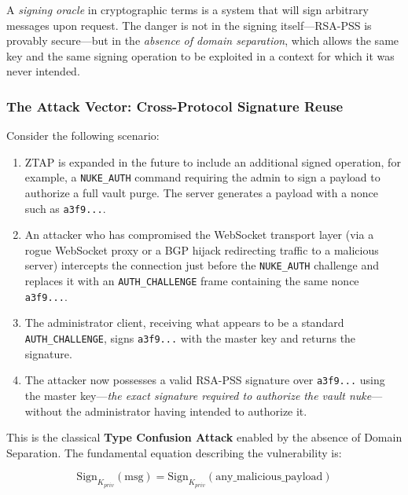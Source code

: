 \documentclass[12pt,a4paper]{article}
\begin{document}
A \textit{signing oracle} in cryptographic terms is a system that will sign arbitrary messages upon request. The danger is not in the signing itself---RSA-PSS is provably secure---but in the \textit{absence of domain separation}, which allows the same key and the same signing operation to be exploited in a context for which it was never intended.

\subsubsection{The Attack Vector: Cross-Protocol Signature Reuse}

Consider the following scenario:

\begin{enumerate}
    \item ZTAP is expanded in the future to include an additional signed operation, for example, a \texttt{NUKE\_AUTH} command requiring the admin to sign a payload to authorize a full vault purge. The server generates a payload with a nonce such as \texttt{a3f9...}. 
    
    \item An attacker who has compromised the WebSocket transport layer (via a rogue WebSocket proxy or a BGP hijack redirecting traffic to a malicious server) intercepts the connection just before the \texttt{NUKE\_AUTH} challenge and replaces it with an \texttt{AUTH\_CHALLENGE} frame containing the same nonce \texttt{a3f9...}.
    
    \item The administrator client, receiving what appears to be a standard \texttt{AUTH\_CHALLENGE}, signs \texttt{a3f9...} with the master key and returns the signature.
    
    \item The attacker now possesses a valid RSA-PSS signature over \texttt{a3f9...} using the master key---\textit{the exact signature required to authorize the vault nuke}---without the administrator having intended to authorize it.
\end{enumerate}

This is the classical \textbf{Type Confusion Attack} enabled by the absence of Domain Separation. The fundamental equation describing the vulnerability is:

\begin{equation}
    \text{Sign}_{K_{priv}}(\text{msg}) = \text{Sign}_{K_{priv}}(\text{any\_malicious\_payload})
\end{equation}
\end{document}

